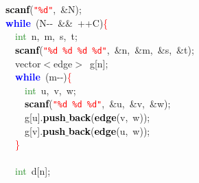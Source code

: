 {{\mbox{}\ \ \textbf{\textcolor{Black}{scanf}}\textcolor{BrickRed}{(}\texttt{\textcolor{Red}{"{}\%d"{}}}\textcolor{BrickRed}{,}\ \textcolor{BrickRed}{\&}N\textcolor{BrickRed}{);} \\
\mbox{}\ \ \textbf{\textcolor{Blue}{while}}\ \textcolor{BrickRed}{(}N\textcolor{BrickRed}{-\/-}\ \textcolor{BrickRed}{\&\&}\ \textcolor{BrickRed}{++}C\textcolor{BrickRed}{)}\textcolor{Red}{\{} \\
\mbox{}\ \ \ \ \textcolor{ForestGreen}{int}\ n\textcolor{BrickRed}{,}\ m\textcolor{BrickRed}{,}\ s\textcolor{BrickRed}{,}\ t\textcolor{BrickRed}{;} \\
\mbox{}\ \ \ \ \textbf{\textcolor{Black}{scanf}}\textcolor{BrickRed}{(}\texttt{\textcolor{Red}{"{}\%d\ \%d\ \%d\ \%d"{}}}\textcolor{BrickRed}{,}\ \textcolor{BrickRed}{\&}n\textcolor{BrickRed}{,}\ \textcolor{BrickRed}{\&}m\textcolor{BrickRed}{,}\ \textcolor{BrickRed}{\&}s\textcolor{BrickRed}{,}\ \textcolor{BrickRed}{\&}t\textcolor{BrickRed}{);} \\
\mbox{}\ \ \ \ vector\textcolor{BrickRed}{$<$}edge\textcolor{BrickRed}{$>$}\ g\textcolor{BrickRed}{[}n\textcolor{BrickRed}{];} \\
\mbox{}\ \ \ \ \textbf{\textcolor{Blue}{while}}\ \textcolor{BrickRed}{(}m\textcolor{BrickRed}{-\/-)}\textcolor{Red}{\{} \\
\mbox{}\ \ \ \ \ \ \textcolor{ForestGreen}{int}\ u\textcolor{BrickRed}{,}\ v\textcolor{BrickRed}{,}\ w\textcolor{BrickRed}{;} \\
\mbox{}\ \ \ \ \ \ \textbf{\textcolor{Black}{scanf}}\textcolor{BrickRed}{(}\texttt{\textcolor{Red}{"{}\%d\ \%d\ \%d"{}}}\textcolor{BrickRed}{,}\ \textcolor{BrickRed}{\&}u\textcolor{BrickRed}{,}\ \textcolor{BrickRed}{\&}v\textcolor{BrickRed}{,}\ \textcolor{BrickRed}{\&}w\textcolor{BrickRed}{);} \\
\mbox{}\ \ \ \ \ \ g\textcolor{BrickRed}{[}u\textcolor{BrickRed}{].}\textbf{\textcolor{Black}{push$\_$back}}\textcolor{BrickRed}{(}\textbf{\textcolor{Black}{edge}}\textcolor{BrickRed}{(}v\textcolor{BrickRed}{,}\ w\textcolor{BrickRed}{));} \\
\mbox{}\ \ \ \ \ \ g\textcolor{BrickRed}{[}v\textcolor{BrickRed}{].}\textbf{\textcolor{Black}{push$\_$back}}\textcolor{BrickRed}{(}\textbf{\textcolor{Black}{edge}}\textcolor{BrickRed}{(}u\textcolor{BrickRed}{,}\ w\textcolor{BrickRed}{));} \\
\mbox{}\ \ \ \ \textcolor{Red}{\}} \\
\mbox{} \\
\mbox{}\ \ \ \ \textcolor{ForestGreen}{int}\ d\textcolor{BrickRed}{[}n\textcolor{BrickRed}{];} \\
}}
